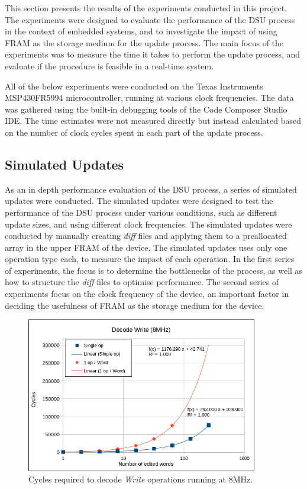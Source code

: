 This section presents the results of the experiments conducted in this project. The experiments were designed to evaluate the performance of the DSU process in the context of embedded systems, and to investigate the impact of using FRAM as the storage medium for the update process. The main focus of the experiments was to measure the time it takes to perform the update process, and evaluate if the procedure is feasible in a real-time system.

All of the below experiments were conducted on the Texas Instruments MSP430FR5994 microcontroller, running at various clock frequencies. The data was gathered using the built-in debugging tools of the Code Composer Studio IDE. The time estimates were not measured directly but instead calculated based on the number of clock cycles spent in each part of the update process. 

\subsection{Simulated Updates}
As an in depth performance evaluation of the DSU process, a series of simulated updates were conducted. The simulated updates were designed to test the performance of the DSU process under various conditions, such as different update sizes, and using different clock frequencies. The simulated updates were conducted by manually creating \textit{diff} files and applying them to a preallocated array in the upper FRAM of the device. The simulated updates uses only one operation type each, to measure the impact of each operation. In the first series of experiments, the focus is to determine the bottlenecks of the process, as well as how to structure the \textit{diff} files to optimise performance. The second series of experiments focus on the clock frequency of the device, an important factor in deciding the usefulness of FRAM as the storage medium for the device.
\begin{figure}[!ht]
    \centering
    \caption{Cycles required to decode \textit{Write} operations running at 8MHz.}
    \label{fig:wDecode8}
    \includegraphics[width=0.9\textwidth]{img/WDecode8.png}
\end{figure}

